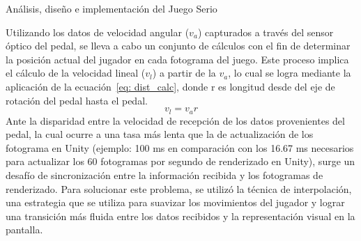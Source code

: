 \begin{thesischapter}{2} {Análisis, diseño e implementación del Juego Serio}



    



    \vspace{10pt}
    Utilizando los datos de velocidad angular ($v_{a}$) capturados a través del sensor óptico del pedal, se lleva a 
    cabo un conjunto de cálculos con el fin de determinar la posición actual del jugador en cada fotograma 
    del juego. Este proceso implica el cálculo de la velocidad lineal ($v_{l}$) a partir de la $v_{a}$, lo 
    cual se logra mediante la aplicación de la ecuación~\ref{eq: dist_calc}, donde r es longitud desde del eje de rotación del pedal hasta el pedal.
    \begin{equation}
        v_{l} = v_{a}r
        \label{eq: dist_calc}        
    \end{equation}
    Ante la disparidad entre la velocidad de recepción de los datos provenientes del pedal, la cual ocurre a una tasa más lenta que la de actualización de los fotograma en Unity
    (ejemplo: 100 ms en comparación con los 16.67 ms necesarios para actualizar los 60 fotogramas por segundo de renderizado en Unity), surge un desafío de sincronización entre la información 
    recibida y los fotogramas de renderizado. Para solucionar este problema, se utilizó la técnica de interpolación, una estrategia que se utiliza para suavizar los movimientos 
    del jugador y lograr una transición más fluida entre los datos recibidos y la representación visual en la pantalla.


\end{thesischapter}
